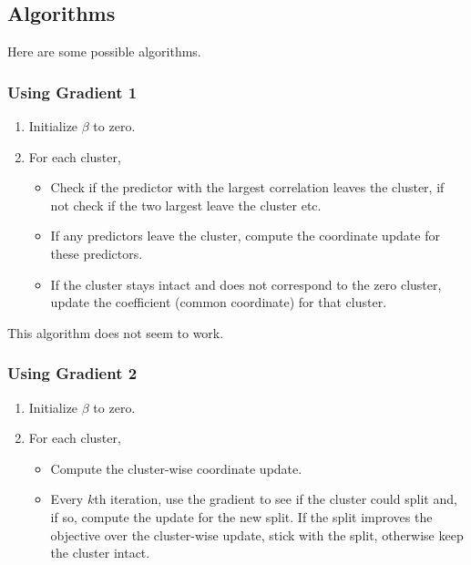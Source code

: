 \subsection{Algorithms}

Here are some possible algorithms.

\subsubsection{Using Gradient 1}

\begin{enumerate}
  \item Initialize \(\beta\) to zero.
  \item For each cluster,
        \begin{itemize}
          \item Check if the predictor with the largest correlation leaves the
                cluster, if not check if the two largest leave the cluster etc.
          \item If any predictors leave the cluster, compute the coordinate
                update for these predictors.
          \item If the cluster stays intact and does not correspond to the
                zero cluster, update the coefficient (common coordinate) for that
                cluster.
        \end{itemize}
\end{enumerate}

This algorithm does not seem to work.

\subsubsection{Using Gradient 2}

\begin{enumerate}
  \item Initialize \(\beta\) to zero.
  \item For each cluster,
        \begin{itemize}
          \item Compute the cluster-wise coordinate update.
          \item Every \(k\)th iteration, use the gradient to see if the cluster
            could split and, if so, compute the update for the new split.
            If the split improves the objective over the cluster-wise update,
            stick with the split, otherwise keep the cluster intact.
        \end{itemize}
\end{enumerate}

